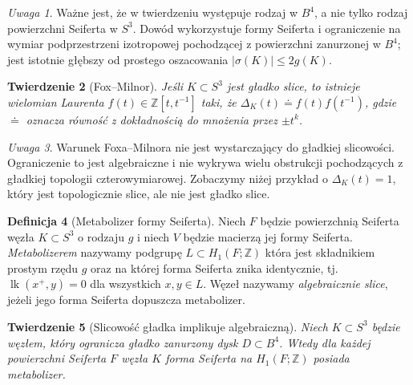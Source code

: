 \documentclass[11pt,a4paper]{report}
\numberwithin{equation}{section}
\theoremstyle{plain}
\newtheorem{twierdzenie}{Twierdzenie}[section]
\theoremstyle{definition}
\newtheorem{definicja}[twierdzenie]{Definicja}
\theoremstyle{remark}
\newtheorem{uwaga}[twierdzenie]{Uwaga}
\begin{document}
\begin{uwaga}
Ważne jest, że w twierdzeniu występuje rodzaj w $B^4$,
a nie tylko rodzaj powierzchni Seiferta w $S^3$.
Dowód wykorzystuje formy Seiferta i ograniczenie
na wymiar podprzestrzeni izotropowej pochodzącej
z powierzchni zanurzonej w $B^4$; jest istotnie głębszy
od prostego oszacowania $|\sigma(K)|\leq2g(K)$.
\end{uwaga}

\begin{twierdzenie}[Fox--Milnor]
Jeśli $K\subset S^3$ jest gładko slice, to istnieje
wielomian Laurenta $f(t)\in\mathbb Z[t,t^{-1}]$ taki, że
$\Delta_K(t)\doteq f(t)f(t^{-1})$,
gdzie $\doteq$ oznacza równość z dokładnością do
mnożenia przez $\pm t^k$.
\end{twierdzenie}

\begin{uwaga}
Warunek Foxa--Milnora nie jest wystarczający do gładkiej
slicowości. Ograniczenie to jest algebraiczne i nie wykrywa
wielu obstrukcji pochodzących z gładkiej topologii
czterowymiarowej. Zobaczymy niżej przykład o
$\Delta_K(t)=1$, który jest topologicznie slice,
ale nie jest gładko slice.
\end{uwaga}

\begin{definicja}[Metabolizer formy Seiferta]
Niech $F$ będzie powierzchnią Seiferta węzła $K\subset S^3$
o rodzaju $g$ i niech $V$ będzie macierzą jej formy Seiferta.
\emph{Metabolizerem} nazywamy podgrupę $L\subset H_1(F;\mathbb Z)$
która jest składnikiem prostym rzędu $g$ oraz na której
forma Seiferta znika identycznie, tj.
$\operatorname{lk}(x^+,y)=0$ dla wszystkich $x,y\in L$.
Węzeł nazywamy \emph{algebraicznie slice}, jeżeli jego
forma Seiferta dopuszcza metabolizer.
\end{definicja}

\begin{twierdzenie}[Slicowość gładka implikuje algebraiczną]
Niech $K\subset S^3$ będzie węzłem, który ogranicza gładko
zanurzony dysk $D\subset B^4$. Wtedy dla każdej powierzchni
Seiferta $F$ węzła $K$ forma Seiferta na $H_1(F;\mathbb Z)$
posiada metabolizer.
\end{twierdzenie}
\end{document}
